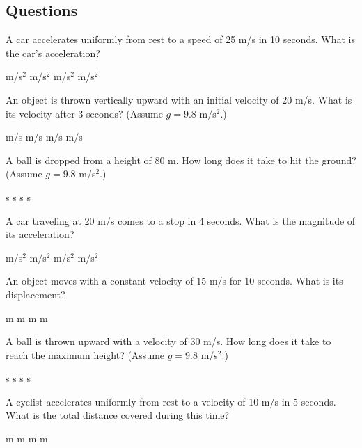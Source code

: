 \documentclass[addpoints]{exam}
\begin{document}
\newpage
\begin{questions}

\section*{Questions}

\question[1] A car accelerates uniformly from rest to a speed of 25 m/s in 10 seconds. What is the car's acceleration?
\begin{choices}
     m/s$^2$
     m/s$^2$
     m/s$^2$
     m/s$^2$
\end{choices}

\question[1] An object is thrown vertically upward with an initial velocity of 20 m/s. What is its velocity after 3 seconds? (Assume $g = 9.8$ m/s$^2$.)
\begin{choices}
     m/s
     m/s
     m/s
     m/s
\end{choices}

\question[1] A ball is dropped from a height of 80 m. How long does it take to hit the ground? (Assume $g = 9.8$ m/s$^2$.)
\begin{choices}
     s
     s
     s
     s
\end{choices}

\question[1] A car traveling at 20 m/s comes to a stop in 4 seconds. What is the magnitude of its acceleration?
\begin{choices}
     m/s$^2$
     m/s$^2$
     m/s$^2$
     m/s$^2$
\end{choices}

\question[1] An object moves with a constant velocity of 15 m/s for 10 seconds. What is its displacement?
\begin{choices}
     m
     m
     m
     m
\end{choices}

\question[1] A ball is thrown upward with a velocity of 30 m/s. How long does it take to reach the maximum height? (Assume $g = 9.8$ m/s$^2$.)
\begin{choices}
     s
     s
     s
     s
\end{choices}

\question[1] A cyclist accelerates uniformly from rest to a velocity of 10 m/s in 5 seconds. What is the total distance covered during this time?
\begin{choices}
     m
     m
     m
     m
\end{choices}



\end{questions}
\end{document}
